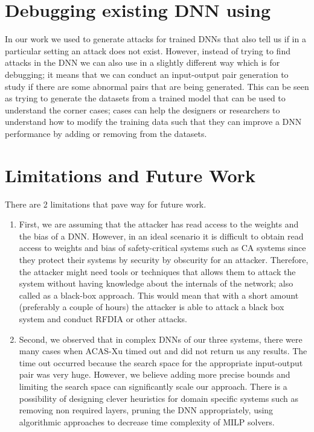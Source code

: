 \section{Debugging existing DNN using \tool}
In our work we used \tool to generate attacks for trained \ac{DNN}s that also tell us if in a particular setting an attack does not exist. 
However, instead of trying to find attacks in the \ac{DNN} we can also use \tool in a slightly different way which is for debugging; it means that we can conduct an input-output pair generation to study if there are some abnormal pairs that are being generated. 
This can be seen as trying to generate the datasets from a trained model that can be used to understand the corner cases; cases can help the designers or researchers to understand how to modify the training data such that they can improve a \ac{DNN} performance by adding or removing from the datasets. 







\section{ Limitations  and Future Work}

There are 2 limitations that pave way for future work. 
\begin{enumerate}
	\item First, we are assuming that the attacker has read access to the weights and the bias of a \ac{DNN}.
	However, in an ideal scenario it is difficult to obtain read access to weights and bias of safety-critical systems such as \ac{CA} systems since they protect their systems by security by obscurity for an attacker. 
	Therefore, the attacker might need tools or techniques that allows them to attack the system without having knowledge about the internals of the network; also called as a black-box approach. 
	This would mean that with a short amount (preferably a couple of hours) the attacker is able to attack a black box system and conduct \ac{RFDIA} or other attacks. 
	\item Second, we observed that in complex \ac{DNN}s of our three systems, there were many cases when  \ac{ACAS-Xu} timed out and did not return us any results. 
	The time out occurred because the search space for the appropriate input-output pair was very huge. 
	However, we believe adding more precise bounds and limiting the search space can significantly scale our approach. 
	There is a possibility of designing clever heuristics for domain specific systems such as removing non required layers, pruning the \ac{DNN} appropriately, using algorithmic approaches to decrease time complexity of \ac{MILP} solvers. 
	
	\label{section:limitations}
	
\end{enumerate}




